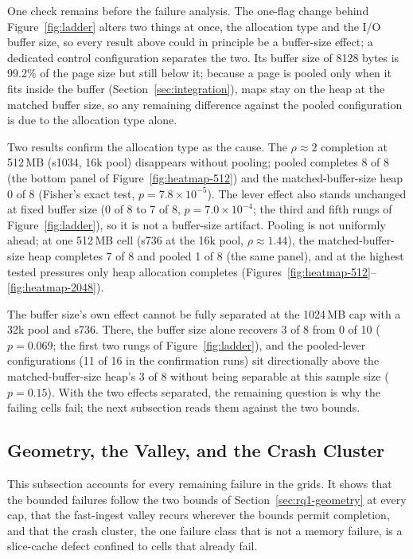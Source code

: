 \FloatBarrier
One check remains before the failure analysis.
The one-flag change behind Figure~\ref{fig:ladder} alters two things at once, the allocation type and the I/O buffer size, so every result above could in principle be a buffer-size effect; a dedicated control configuration separates the two.\label{sec:disambiguation}
Its buffer size of 8128 bytes is 99.2\% of the page size but still below it; because a page is pooled only when it fits inside the buffer (Section~\ref{sec:integration}), maps stay on the heap at the matched buffer size, so any remaining difference against the pooled configuration is due to the allocation type alone.

Two results confirm the allocation type as the cause.
The $\rho \approx 2$ completion at 512\,MB (s1034, 16k pool) disappears without pooling; pooled completes 8 of 8 (the bottom panel of Figure~\ref{fig:heatmap-512}) and the matched-buffer-size heap 0 of 8 (Fisher's exact test, $p = 7.8 \times 10^{-5}$).
The lever effect also stands unchanged at fixed buffer size (0 of 8 to 7 of 8, $p = 7.0 \times 10^{-4}$; the third and fifth rungs of Figure~\ref{fig:ladder}), so it is not a buffer-size artifact.
Pooling is not uniformly ahead; at one 512\,MB cell (s736 at the 16k pool, $\rho \approx 1.44$), the matched-buffer-size heap completes 7 of 8 and pooled 1 of 8 (the same panel), and at the highest tested pressures only heap allocation completes (Figures~\ref{fig:heatmap-512}--\ref{fig:heatmap-2048}).

The buffer size's own effect cannot be fully separated at the 1024\,MB cap with a 32k pool and s736.
There, the buffer size alone recovers 3 of 8 from 0 of 10 ($p = 0.069$; the first two rungs of Figure~\ref{fig:ladder}), and the pooled-lever configurations (11 of 16 in the confirmation runs) sit directionally above the matched-buffer-size heap's 3 of 8 without being separable at this sample size ($p = 0.15$).
With the two effects separated, the remaining question is why the failing cells fail; the next subsection reads them against the two bounds.

\FloatBarrier
\subsection{Geometry, the Valley, and the Crash Cluster\label{sec:geometry-valley}}

This subsection accounts for every remaining failure in the grids.
It shows that the bounded failures follow the two bounds of Section~\ref{sec:rq1-geometry} at every cap, that the fast-ingest valley recurs wherever the bounds permit completion, and that the crash cluster, the one failure class that is not a memory failure, is a slice-cache defect confined to cells that already fail.

